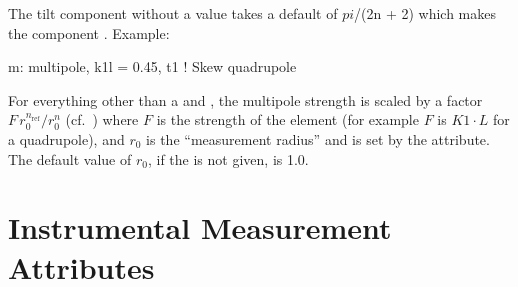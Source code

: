 The  tilt component without a value takes a default of $pi$/(2n + 2) which makes
the component .
Example:
\begin{example}
  m: multipole, k1l = 0.45, t1  ! Skew quadrupole
\end{example}

For everything other than a  and , the
multipole strength is scaled by a factor $F \, r_0^{n_\text{ref}} /
r_0^n$ (cf.~) where $F$ is the strength of the element (for
example $F$ is $K1 \cdot L$ for a quadrupole), and $r_0$ is the
``measurement radius'' and is set by the  attribute. The
default value of $r_0$, if the  is not given, is 1.0.

\section{Instrumental Measurement Attributes}
\label{s:meas.attrib}


